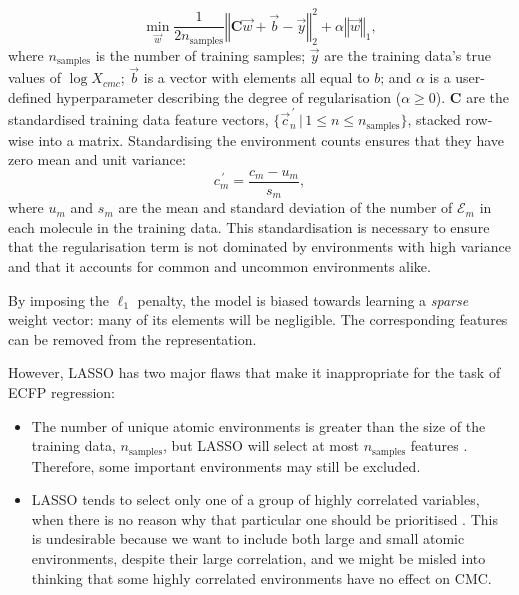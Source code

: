 \begin{equation}
    \min_{\vec{w}} { \frac{1}{2n_{\text{samples}}} \left \Vert \mathbf{C}\vec{w} + \vec{b} - \vec{y} \right \Vert_2 ^ 2 + \alpha \left \Vert \vec{w} \right \Vert_1},
\end{equation}
where $n_{\text{samples}}$ is the number of training samples; $\vec{y}$ are the
training data's true values of $\log X_{cmc}$; $\vec{b}$ is a vector with
elements all equal to $b$; and $\alpha$ is a user-defined hyperparameter
describing the degree of regularisation ($\alpha \geq 0$). $\mathbf{C}$ are the
standardised training data feature vectors, $\{\vec{c}^{\,\prime}_n \,|\, 1 \leq
n \leq n_\text{samples}\}$, stacked row-wise into a matrix. Standardising the
environment counts ensures that they have zero mean and unit variance:
\begin{equation}
    \label{eq:standard-scaling}
    {c}^{\,\prime}_m = \frac{c_m - u_m}{s_m},
\end{equation}
where $u_m$ and $s_m$ are the mean and standard deviation of the number of
$\mathcal{E}_m$ in each molecule in the training data. This standardisation is
necessary to ensure that the regularisation term is not dominated by
environments with high variance and that it accounts for common and uncommon
environments alike.

By imposing the $\ell_1$ penalty, the model is biased towards learning a
\emph{sparse} weight vector: many of its elements will be negligible. The
corresponding features can be removed from the representation.

However, LASSO has two major flaws that make it inappropriate for the task of
ECFP regression:

\begin{itemize}
    \item The number of unique atomic environments is greater than the size of
          the training data, $n_\text{samples}$, but LASSO will select at most
          $n_\text{samples}$ features \cite{efronLeastAngleRegression2004}.
          Therefore, some important environments may still be excluded.
    \item LASSO tends to select only one of a group of highly correlated
          variables, when there is no reason why that particular one should be
          prioritised \cite{zouRegularizationVariableSelection2005}. This is
          undesirable because we want to include both large and small atomic
          environments, despite their large correlation, and we might be misled into
          thinking that some highly correlated environments have no effect on CMC.
\end{itemize}


